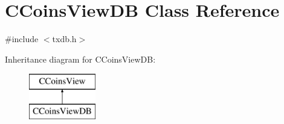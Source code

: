 \hypertarget{class_c_coins_view_d_b}{}\section{C\+Coins\+View\+DB Class Reference}
\label{class_c_coins_view_d_b}


{\ttfamily \#include $<$txdb.\+h$>$}

Inheritance diagram for C\+Coins\+View\+DB\+:\begin{figure}[H]
\begin{center}
\leavevmode
\includegraphics[height=2.000000cm]{class_c_coins_view_d_b}
\end{center}
\end{figure}
